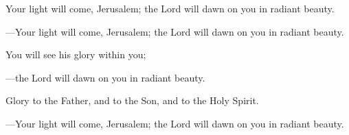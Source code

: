 \responsory

\begin{hangpar}
Your light will come, Jerusalem;
the Lord will dawn on you in radiant beauty.

{\color{red}---\thinspace }Your light will come, Jerusalem;
the Lord will dawn on you in radiant beauty.

\medskip You will see his glory within you;

{\color{red}---\thinspace }the Lord will dawn on you in radiant beauty.

\medskip Glory to the Father, and to the Son, and to the Holy Spirit.

{\color{red}---\thinspace }Your light will come, Jerusalem;
the Lord will dawn on you in radiant beauty.
\end{hangpar}